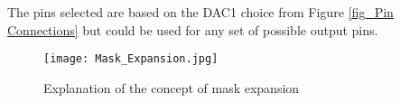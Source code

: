 \documentclass[../main.tex]{subfiles}
\begin{document}
The pins selected are based on the DAC1 choice from Figure \ref{fig_Pin Connections} but could be used for any set of possible output pins.

\begin{figure}[ht]
	\centering
	\texttt{[image: Mask\_Expansion.jpg]}
	\caption{Explanation of the concept of mask expansion}
\end{figure}
\end{document}
